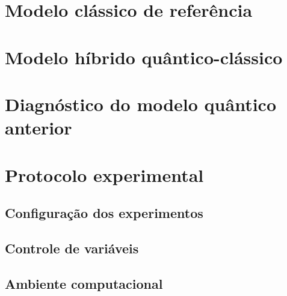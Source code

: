 \documentclass[
    12pt,
    openright,
    oneside,
    a4paper,
    english,
    brazil
]{abntex2}
\begin{document}

\section{Modelo clássico de referência}


\section{Modelo híbrido quântico-clássico}


\section{Diagnóstico do modelo quântico anterior}


\section{Protocolo experimental}


\subsection{Configuração dos experimentos}
\subsection{Controle de variáveis}
\subsection{Ambiente computacional}
\end{document}

